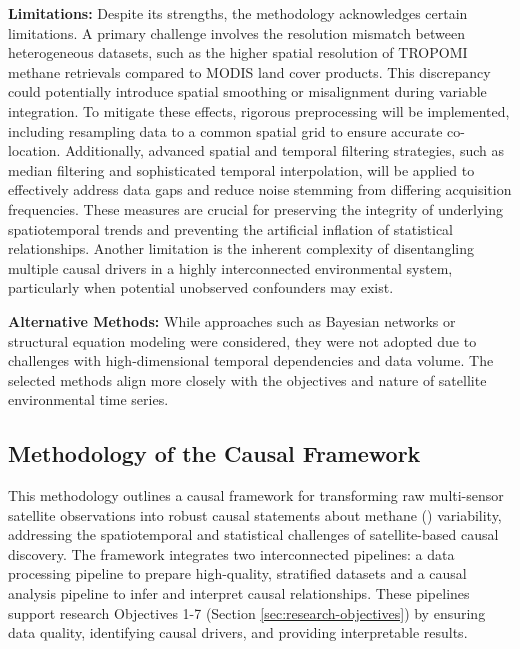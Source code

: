 \textbf{Limitations:}
Despite its strengths, the methodology acknowledges certain limitations. A primary challenge involves the resolution mismatch between heterogeneous datasets, such as the higher spatial resolution of TROPOMI methane retrievals compared to MODIS land cover products. This discrepancy could potentially introduce spatial smoothing or misalignment during variable integration. To mitigate these effects, rigorous preprocessing will be implemented, including resampling data to a common spatial grid to ensure accurate co-location. Additionally, advanced spatial and temporal filtering strategies, such as median filtering and sophisticated temporal interpolation, will be applied to effectively address data gaps and reduce noise stemming from differing acquisition frequencies. These measures are crucial for preserving the integrity of underlying spatiotemporal trends and preventing the artificial inflation of statistical relationships. Another limitation is the inherent complexity of disentangling multiple causal drivers in a highly interconnected environmental system, particularly when potential unobserved confounders may exist.

\textbf{Alternative Methods:}
While approaches such as Bayesian networks or structural equation modeling were considered, they were not adopted due to challenges with high-dimensional temporal dependencies and data volume. The selected methods align more closely with the objectives and nature of satellite environmental time series.

\subsection{Methodology of the Causal Framework}
\label{sec:metho_causal_framework}

This methodology outlines a causal framework for transforming raw multi-sensor satellite observations into robust causal statements about methane () variability, addressing the spatiotemporal and statistical challenges of satellite-based causal discovery. The framework integrates two interconnected pipelines: a data processing pipeline to prepare high-quality, stratified datasets and a causal analysis pipeline to infer and interpret causal relationships. These pipelines support research Objectives 1-7 (Section \ref{sec:research-objectives}) by ensuring data quality, identifying causal drivers, and providing interpretable results.

